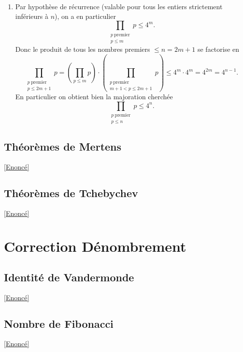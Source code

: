 \documentclass[8pt]{book}
\begin{document}
\begin{enumerate}[leftmargin=*]
		En combinant les deux observations on obtient
		\[
		\prod_{\substack{p\ \text{premier}\\ m+1<p\le 2m+1}} p \le \binom{2m+1}{m} \le 4^{m}.
		\]
		\item 
		Par hypothèse de récurrence (valable pour tous les entiers strictement inférieurs à \(n\)), on a en particulier
		\[
		\prod_{\substack{p\ \text{premier}\\ p\le m}} p \le 4^{m}.
		\]
		Donc le produit de tous les nombres premiers \(\le n=2m+1\) se factorise en
		\[
		\prod_{\substack{p\ \text{premier}\\ p\le 2m+1}} p
		=
		\left(\prod_{p\le m} p\right)\cdot
		\left(\prod_{\substack{p\ \text{premier}\\ m+1<p\le 2m+1}} p\right)
		\le 4^{m}\cdot 4^{m}=4^{2m}=4^{n-1}.
		\]
		En particulier on obtient bien la majoration cherchée
		\[
		\prod_{\substack{p\ \text{premier}\\ p\le n}} p \le 4^{n}.
		\]
	\end{enumerate}
	
	\subsection{Théorèmes de Mertens}
	\label{Théorèmes de Mertens corrigé}
	\textcolor{blue}{\hyperref[Théorème de Mertens]{[Enoncé]}}\\
	
	\subsection{Théorèmes de Tchebychev}
	\label{Théorèmes de Tchebychev corrigé}
	\textcolor{blue}{\hyperref[Théorèmes de Tchebychev]{[Enoncé]}}\\
	
	
	\newpage
\section{Correction Dénombrement}
	\subsection{Identité de Vandermonde}
	\label{Identité de Vandermonde corrigé}
	\textcolor{blue}{\hyperref[Identité de Vandermonde]{[Enoncé]}}\\
	
	\subsection{Nombre de Fibonacci}
	\label{Nombre de Fibonacci corrigé}
	\textcolor{blue}{\hyperref[Nombre de Fibonacci]{[Enoncé]}}\\
\end{document}
